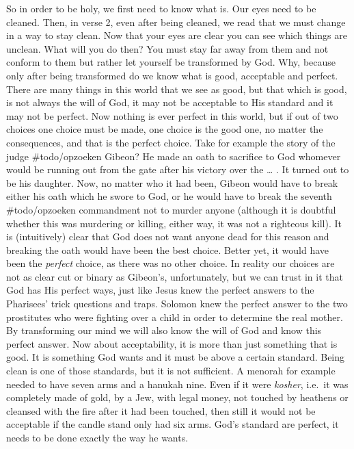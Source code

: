So in order to be holy, we first need to know what is. Our eyes need to
be cleaned. Then, in verse 2, even after being cleaned, we read that we
must change in a way to stay clean. Now that your eyes are clear you can
see which things are unclean. What will you do then? You must stay far
away from them and not conform to them but rather let yourself be
transformed by God. Why, because only after being transformed do we know
what is good, acceptable and perfect. There are many things in this
world that we see as good, but that which is good, is not always the
will of God, it may not be acceptable to His standard and it may not be
perfect. Now nothing is ever perfect in this world, but if out of two
choices one choice must be made, one choice is the good one, no matter
the consequences, and that is the perfect choice. Take for example the
story of the judge \#todo/opzoeken Gibeon? He made an oath to sacrifice
to God whomever would be running out from the gate after his victory
over the \ldots{} . It turned out to be his daughter. Now, no matter who
it had been, Gibeon would have to break either his oath which he swore
to God, or he would have to break the seventh \#todo/opzoeken
commandment not to murder anyone (although it is doubtful whether this
was murdering or killing, either way, it was not a righteous kill). It
is (intuitively) clear that God does not want anyone dead for this
reason and breaking the oath would have been the best choice. Better
yet, it would have been the \emph{perfect} choice, as there was no other
choice. In reality our choices are not as clear cut or binary as
Gibeon's, unfortunately, but we can trust in it that God has His perfect
ways, just like Jesus knew the perfect answers to the Pharisees' trick
questions and traps. Solomon knew the perfect answer to the two
prostitutes who were fighting over a child in order to determine the
real mother. By transforming our mind we will also know the will of God
and know this perfect answer. Now about acceptability, it is more than
just something that is good. It is something God wants and it must be
above a certain standard. Being clean is one of those standards, but it
is not sufficient. A menorah for example needed to have seven arms and a
hanukah nine. Even if it were \emph{kosher}, i.e.~it was completely made
of gold, by a Jew, with legal money, not touched by heathens or cleansed
with the fire after it had been touched, then still it would not be
acceptable if the candle stand only had six arms. God's standard are
perfect, it needs to be done exactly the way he wants.

